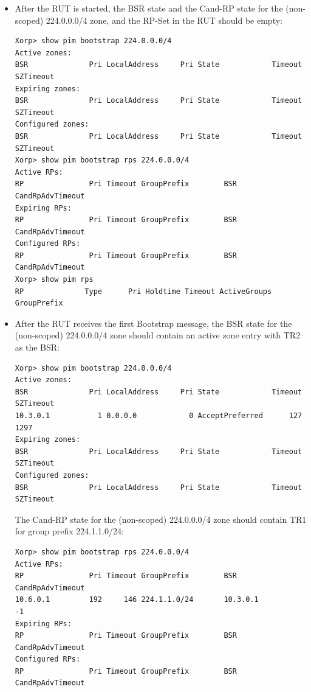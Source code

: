 \documentclass[11pt]{report}
\begin{document}
\begin{itemize}

  \item After the RUT is started, the BSR state and the Cand-RP state for the
 (non-scoped) 224.0.0.0/4 zone, and the RP-Set in the RUT should be empty:

\begin{verbatim}
Xorp> show pim bootstrap 224.0.0.0/4
Active zones:
BSR              Pri LocalAddress     Pri State            Timeout SZTimeout
Expiring zones:
BSR              Pri LocalAddress     Pri State            Timeout SZTimeout
Configured zones:
BSR              Pri LocalAddress     Pri State            Timeout SZTimeout
Xorp> show pim bootstrap rps 224.0.0.0/4
Active RPs:
RP               Pri Timeout GroupPrefix        BSR         CandRpAdvTimeout
Expiring RPs:
RP               Pri Timeout GroupPrefix        BSR         CandRpAdvTimeout
Configured RPs:
RP               Pri Timeout GroupPrefix        BSR         CandRpAdvTimeout
Xorp> show pim rps 
RP              Type      Pri Holdtime Timeout ActiveGroups GroupPrefix       
\end{verbatim}

  \item After the RUT receives the first Bootstrap message, the BSR state for
  the (non-scoped) 224.0.0.0/4 zone should contain an active zone entry with
  TR2 as the BSR:

\begin{verbatim}
Xorp> show pim bootstrap 224.0.0.0/4
Active zones:
BSR              Pri LocalAddress     Pri State            Timeout SZTimeout
10.3.0.1           1 0.0.0.0            0 AcceptPreferred      127      1297
Expiring zones:
BSR              Pri LocalAddress     Pri State            Timeout SZTimeout
Configured zones:
BSR              Pri LocalAddress     Pri State            Timeout SZTimeout
\end{verbatim}

  The Cand-RP state for the (non-scoped) 224.0.0.0/4 zone should contain TR1
  for group prefix 224.1.1.0/24:

\begin{verbatim}
Xorp> show pim bootstrap rps 224.0.0.0/4
Active RPs:
RP               Pri Timeout GroupPrefix        BSR         CandRpAdvTimeout
10.6.0.1         192     146 224.1.1.0/24       10.3.0.1                  -1
Expiring RPs:
RP               Pri Timeout GroupPrefix        BSR         CandRpAdvTimeout
Configured RPs:
RP               Pri Timeout GroupPrefix        BSR         CandRpAdvTimeout
\end{verbatim}


\end{itemize}
\end{document}
